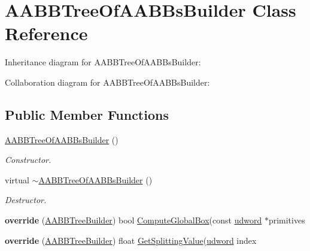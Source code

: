 \hypertarget{class_a_a_b_b_tree_of_a_a_b_bs_builder}{\section{A\+A\+B\+B\+Tree\+Of\+A\+A\+B\+Bs\+Builder Class Reference}
\label{class_a_a_b_b_tree_of_a_a_b_bs_builder}
}


Inheritance diagram for A\+A\+B\+B\+Tree\+Of\+A\+A\+B\+Bs\+Builder\+:


Collaboration diagram for A\+A\+B\+B\+Tree\+Of\+A\+A\+B\+Bs\+Builder\+:
\subsection*{Public Member Functions}
\begin{DoxyCompactItemize}
\item 
\hypertarget{class_a_a_b_b_tree_of_a_a_b_bs_builder_a108af2bfc576e2561eaee38fdabc2452}{\hyperlink{class_a_a_b_b_tree_of_a_a_b_bs_builder_a108af2bfc576e2561eaee38fdabc2452}{A\+A\+B\+B\+Tree\+Of\+A\+A\+B\+Bs\+Builder} ()}\label{class_a_a_b_b_tree_of_a_a_b_bs_builder_a108af2bfc576e2561eaee38fdabc2452}

\begin{DoxyCompactList}\small\item\em Constructor. \end{DoxyCompactList}\item 
\hypertarget{class_a_a_b_b_tree_of_a_a_b_bs_builder_a7ecceb64442ad56862a5cd766a6be82e}{virtual \hyperlink{class_a_a_b_b_tree_of_a_a_b_bs_builder_a7ecceb64442ad56862a5cd766a6be82e}{$\sim$\+A\+A\+B\+B\+Tree\+Of\+A\+A\+B\+Bs\+Builder} ()}\label{class_a_a_b_b_tree_of_a_a_b_bs_builder_a7ecceb64442ad56862a5cd766a6be82e}

\begin{DoxyCompactList}\small\item\em Destructor. \end{DoxyCompactList}\item 
\hypertarget{class_a_a_b_b_tree_of_a_a_b_bs_builder_a4dda34eb7aeb4e9e423eebc0968e4cd1}{{\bfseries override} (\hyperlink{class_a_a_b_b_tree_builder}{A\+A\+B\+B\+Tree\+Builder}) bool \hyperlink{class_a_a_b_b_tree_builder_adde85a9974ea5dc2c74fd851e11abf75}{Compute\+Global\+Box}(const \hyperlink{_ice_types_8h_a44c6f1920ba5551225fb534f9d1a1733}{udword} $\ast$primitives}\label{class_a_a_b_b_tree_of_a_a_b_bs_builder_a4dda34eb7aeb4e9e423eebc0968e4cd1}

\item 
\hypertarget{class_a_a_b_b_tree_of_a_a_b_bs_builder_acb1b48ca7ac33204ea27223270e67323}{{\bfseries override} (\hyperlink{class_a_a_b_b_tree_builder}{A\+A\+B\+B\+Tree\+Builder}) float \hyperlink{class_a_a_b_b_tree_builder_acf08d2d4275763e25585aa240e641be1}{Get\+Splitting\+Value}(\hyperlink{_ice_types_8h_a44c6f1920ba5551225fb534f9d1a1733}{udword} index}\label{class_a_a_b_b_tree_of_a_a_b_bs_builder_acb1b48ca7ac33204ea27223270e67323}

\end{DoxyCompactItemize}
